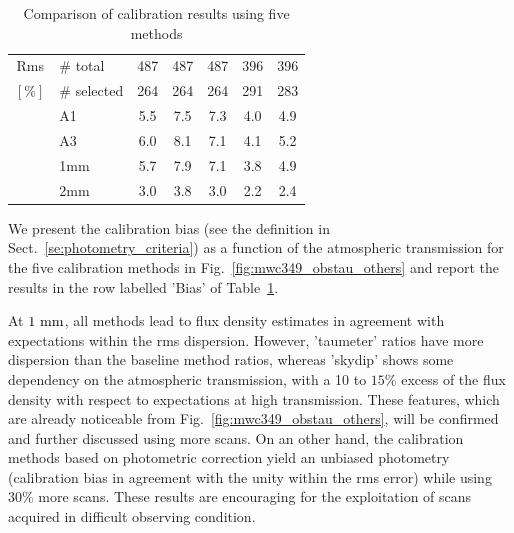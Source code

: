 \begin{table}[th]
\begin{center}
\begin{tabular}{|c|l|c|c|c|c|c|}
  \hline
  Rms  &  $\#$ total    &   487    &    487   &    487    &    396    &  396 \\
  $[\%]$ &  $\#$ selected &   264    &    264   &    264    &    291    &  283 \\
       &  A1            &   5.5    &    7.5   &    7.3    &    4.0    &  4.9 \\
       &  A3            &   6.0    &    8.1   &    7.1    &    4.1    &  5.2 \\
       &  1mm           &   5.7    &    7.9   &    7.1    &    3.8    &  4.9 \\
       &  2mm           &   3.0    &    3.8   &    3.0    &    2.2    &  2.4 \\
\hline\hline
\end{tabular}
\caption[Comparison of calibration results using five methods]{Comparison of calibration results using five methods}
\label{tab:Calibration_results_all}
\end{center}
\end{table}

We present the calibration bias (see the definition in
Sect.~\ref{se:photometry_criteria}) as a function of the atmospheric
transmission for the five calibration methods in
Fig.~\ref{fig:mwc349_obstau_others} and report the results in the row
labelled 'Bias' of Table~\ref{tab:Calibration_results_all}. 

At $1~\rm{mm}$, all methods lead to flux density estimates in
agreement with expectations within the rms dispersion. However,
'taumeter' ratios have more dispersion than the baseline method
ratios, whereas 'skydip' shows some dependency on the atmospheric
transmission, with a 10 to $15\%$ excess of the flux density with
respect to expectations at high transmission. These features, which are
already noticeable from Fig.~\ref{fig:mwc349_obstau_others}, will be
confirmed and further discussed using more scans. On an other hand,
the calibration methods based on photometric correction yield an
unbiased photometry (calibration bias in agreement with the unity
within the rms error) while using $30\%$ more scans. These results are
encouraging for the exploitation of scans acquired in difficult
observing condition.

